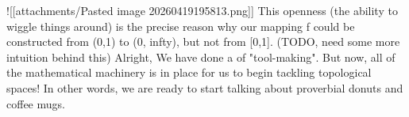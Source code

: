 {}![[attachments/Pasted image 20260419195813.png]]\markdownRendererParagraphSeparator
{}This openness (the ability to wiggle things around) is the precise reason why our mapping \markdownRendererDollarSign{}f\markdownRendererDollarSign{} could be constructed from \markdownRendererDollarSign{}(0,1)\markdownRendererDollarSign{} to \markdownRendererDollarSign{}(0, \markdownRendererBackslash{}infty)\markdownRendererDollarSign{}, but not from \markdownRendererDollarSign{}[0,1]\markdownRendererDollarSign{}. (TODO, need some more intuition behind this)\markdownRendererInterblockSeparator
{}
\markdownRendererSectionEnd \markdownRendererSectionBegin
{}\markdownRendererInterblockSeparator
{}Alright, We have done a  of "tool-making". But now, all of the mathematical machinery is in place for us to begin tackling topological spaces! In other words, we are ready to start talking about proverbial donuts and coffee mugs.
\markdownRendererSectionEnd 
\markdownRendererSectionEnd 
\markdownRendererSectionEnd \markdownRendererDocumentEnd